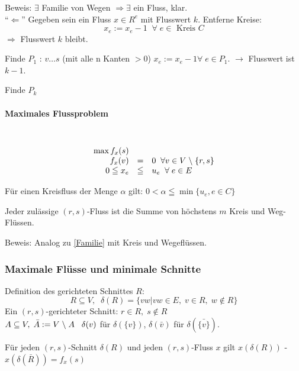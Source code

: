 Beweis: $\exists$ Familie von Wegen $\Rightarrow \exists$ ein Fluss,
klar.\\
"`$\Leftarrow$"' Gegeben sein ein Fluss $x \in R^{e}$ mit Flusswert $k$.
Entferne Kreise:
\[ x_{e} := x_{e} -1 \; \; \forall \; e \in \mbox{ Kreis } C\]
$\Rightarrow$ Flusswert $k$ bleibt.

Finde $P_{1}$ : $v \ldots s$ (mit alle n Kanten $> 0$) $x_{e} := x_{e} -1
\forall \; e \in P_{1}$. $\rightarrow$ Flusswert ist $k-1$.

Finde $P_{k}$

\paragraph{Maximales Flussproblem} \mbox{}\\
\[\begin{array}{rcl}
\max f_{x}(s)\\
f_{x}(v) &=&0 \; \; \forall v \in V \;\backslash\; \{r,s\}\\
0 \leqq x_{e} &\leqq& u_{e} \; \; \forall\; e \in E
\end{array}\]

Für einen Kreisfluss der Menge $\alpha$ gilt: $0 < \alpha \leqq \min
\{u_{e}, e \in C\}$

\begin{lemma}
Jeder zulässige $(r,s)$-Fluss ist die Summe von höchstens $m$ Kreis und
Weg-Flüssen.
\end{lemma}

Beweis: Analog zu \ref{Familie} mit Kreis und Wegeflüssen.

\subsubsection{Maximale Flüsse und minimale Schnitte}

Definition des gerichteten Schnittes $R$:
\[ R \subseteq V, \; \; \delta(R) = \{v w | v w \in E, \; v \in R, \; w \not\in
R\}\]
Ein $(r,s)$-gerichteter Schnitt: $r \in R, \; s \not\in R$\\
$A \subseteq V, \; \bar{A} := V \;\backslash\; A \hspace{3mm} \delta(v)$ für
$\delta(\{v\})$, $\delta(\bar{v})$ für $\delta(\bar{\{v\}})$.

\begin{lemma}\label{SchnittFluss}
Für jeden $(r,s)$-Schnitt $\delta(R)$ und jeden $(r,s)$-Fluss $x$ gilt
$x(\delta(R))$ - $x(\delta(\bar{R})) = f_{x}(s)$
\end{lemma}

